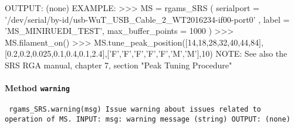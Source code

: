 {\newline
OUTPUT:\newline
(none)\newline
\newline
EXAMPLE:\newline
>>> MS = rgams_SRS ( serialport = '/dev/serial/by-id/usb-WuT_USB_Cable_2_WT2016234-if00-port0' , label = 'MS_MINIRUEDI_TEST', max_buffer_points = 1000 )\newline
>>> MS.filament_on()\newline
>>> MS.tune_peak_position([14,18,28,32,40,44,84],[0.2,0.2,0.025,0.1,0.4,0.1,2.4],['F','F','F','F','F','M','M'],10)\newline
\newline
NOTE:\newline
See also the SRS RGA manual, chapter 7, section "Peak Tuning Procedure"\newline
\newline
}

\paragraph{Method \texttt{warning}}
\vspace{1ex}
\texttt{\newline
rgams_SRS.warning(msg)\newline
\newline
Issue warning about issues related to operation of MS.\newline
\newline
INPUT:\newline
msg: warning message (string)\newline
\newline
OUTPUT:\newline
(none)\newline
\newline
}

